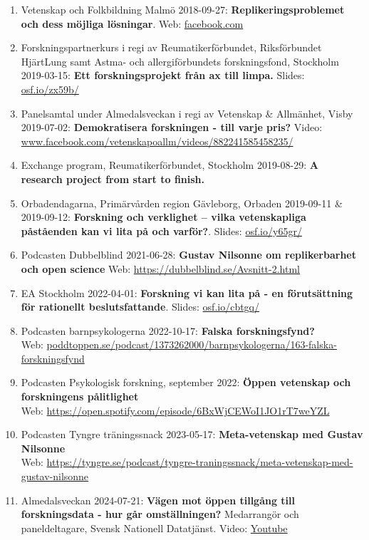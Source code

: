 \documentclass[10pt]{article}
\begin{document}
\begin{enumerate}[nolistsep]
\item Vetenskap och Folkbildning Malmö 2018-09-27: {\bf Replikeringsproblemet och dess möjliga lösningar}. Web: \href{https://www.facebook.com/events/674879442897045/}{facebook.com}
\item Forskningspartnerkurs i regi av Reumatikerförbundet, Riksförbundet HjärtLung samt Astma- och allergiförbundets forskningsfond, Stockholm 2019-03-15: {\bf Ett forskningsprojekt från ax till limpa.} Slides: \href{https://osf.io/zx59b/}{osf.io/zx59b/}
\item Panelsamtal under Almedalsveckan i regi av Vetenskap \& Allmänhet, Visby 2019-07-02: {\bf Demokratisera forskningen - till varje pris?} Video: \href{https://www.facebook.com/vetenskapoallm/videos/882241585458235/}{www.facebook.com/vetenskapoallm/videos/882241585458235/}
\item Exchange program, Reumatikerförbundet, Stockholm 2019-08-29: {\bf A research project from start to finish.}
\item Orbadendagarna, Primärvården region Gävleborg, Orbaden 2019-09-11 \& 2019-09-12: {\bf Forskning och verklighet – vilka vetenskapliga påståenden kan vi lita på och varför?}. Slides: \href{https://osf.io/y65gr/}{osf.io/y65gr/}
\item Podcasten Dubbelblind 2021-06-28: {\bf Gustav Nilsonne om replikerbarhet och open science}
Web: \href{https://dubbelblind.se/Avsnitt-2.html}{https://dubbelblind.se/Avsnitt-2.html}
\item EA Stockholm 2022-04-01: {\bf Forskning vi kan lita på - en förutsättning för rationellt beslutsfattande}. Slides: \href{https://osf.io/cbtgq/}{osf.io/cbtgq/}
\item Podcasten barnpsykologerna 2022-10-17: {\bf Falska forskningsfynd?} \\
Web: \href{https://poddtoppen.se/podcast/1373262000/barnpsykologerna/163-falska-forskningsfynd}{poddtoppen.se/podcast/1373262000/barnpsykologerna/163-falska-forskningsfynd}
\item Podcasten Psykologisk forskning, september 2022: {\bf Öppen vetenskap och forskningens pålitlighet} \\
Web: \href{https://open.spotify.com/episode/6BxWjCEWoI1JO1rT7weYZL}{https://open.spotify.com/episode/6BxWjCEWoI1JO1rT7weYZL}
\item Podcasten Tyngre träningssnack 2023-05-17: {\bf Meta-vetenskap med Gustav Nilsonne} \\
Web: \href{https://tyngre.se/podcast/tyngre-traningssnack/meta-vetenskap-med-gustav-nilsonne}{https://tyngre.se/podcast/tyngre-traningssnack/meta-vetenskap-med-gustav-nilsonne}
\item Almedalsveckan 2024-07-21: {\bf Vägen mot öppen tillgång till forskningsdata - hur går omställningen?} Medarrangör och paneldeltagare, Svensk Nationell Datatjänst. Video: \href{https://www.youtube.com/watch?v=pa9PV9jw5-M}{Youtube}

\end{enumerate}
\end{document}
